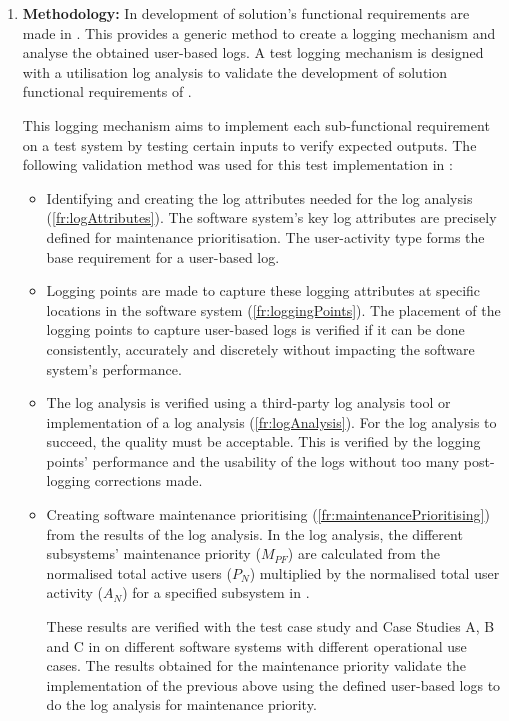 \begin{enumerate}[label=\textbf{\Roman*.}]
	\item \textbf{Methodology:} In  development of solution's functional requirements are made in . This provides a generic method to create a logging mechanism and analyse the obtained user-based logs. A test logging mechanism is designed with a utilisation log analysis to validate the development of solution functional requirements of .\par This logging mechanism aims to implement each sub-functional requirement on a test system by testing certain inputs to verify expected outputs. The following validation method was used for this test implementation in :
		\begin{itemize}
			\item Identifying and creating the log attributes needed for the log analysis (\ref{fr:logAttributes}). The software system's key log attributes are precisely defined for maintenance prioritisation. The user-activity type forms the base requirement for a user-based log.
			
			\item Logging points are made to capture these logging attributes at specific locations in the software system (\ref{fr:loggingPoints}). The placement of the logging points to capture user-based logs is verified if it can be done consistently, accurately and discretely without impacting the software system's performance. 
			
			\item The log analysis is verified using a third-party log analysis tool or implementation of a log analysis (\ref{fr:logAnalysis}). For the log analysis to succeed, the quality must be acceptable. This is verified by the logging points' performance and the usability of the logs without too many post-logging corrections made.
			
			\item Creating software maintenance prioritising (\ref{fr:maintenancePrioritising}) from the results of the log analysis. In the log analysis, the different subsystems' maintenance priority ($M_{PF}$) are calculated from the normalised total active users ($P_N$) multiplied by the normalised total user activity ($A_N$) for a specified subsystem in .\par These results are verified with the test case study and Case Studies A, B and C in  on different software systems with different operational use cases. The results obtained for the maintenance priority validate the implementation of the previous above using the defined user-based logs to do the log analysis for maintenance priority. 
		\end{itemize}


\end{enumerate}
